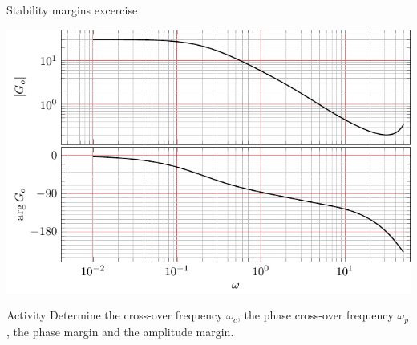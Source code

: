 \documentclass[presentation,aspectratio=169]{beamer}
\begin{document}
\begin{frame}[label={sec:org8d81bce}]{Stability margins excercise}
\begin{center}
  \includegraphics[width=.6\linewidth]{../../figures/bode-example-margin2.pdf}
\end{center}

\alert{Activity} Determine the cross-over frequency \(\omega_c\), the phase cross-over frequency \(\omega_p\), the phase margin and the amplitude margin. 
\end{frame}
\end{document}
